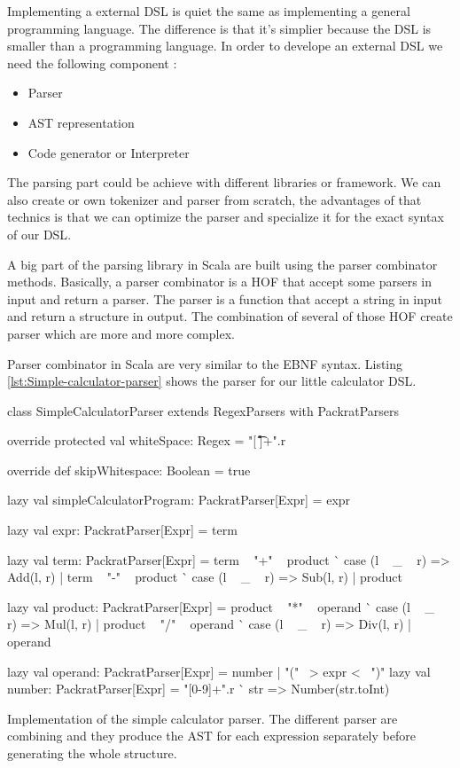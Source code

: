 Implementing a external \gls{DSL} is quiet the same as implementing a general
programming language. The difference is that it's simplier because the \gls{DSL}
is smaller than a programming language. In order to develope an external
\gls{DSL} we need the following component :

\begin{itemize}
\item Parser
\item \gls{AST} representation
\item Code generator or Interpreter
\end{itemize}


The parsing part could be achieve with different libraries or framework. We can
also create or own tokenizer and parser from scratch, the advantages of that
technics is that we can optimize the parser and specialize it for the exact
syntax of our \gls{DSL}.

A big part of the parsing library in Scala are built using the parser combinator
methods. Basically, a parser combinator is a \gls{HOF} that accept
some parsers in input and return a parser. The parser is a function that accept
a string in input and return a structure in output. The combination of several
of those \gls{HOF} create parser which are more and more complex.

Parser combinator in Scala are very similar to the \gls{EBNF} syntax. Listing
\ref{lst:Simple-calculator-parser} shows the parser for our little calculator
\gls{DSL}.

\begin{listing}[ht]
\centering
\begin{scalacode}
class SimpleCalculatorParser extends RegexParsers with PackratParsers {
  override protected val whiteSpace: Regex = "[ \t\r\f\n]+".r

  override def skipWhitespace: Boolean = true

  lazy val simpleCalculatorProgram: PackratParser[Expr] = expr

  lazy val expr: PackratParser[Expr] = term

  lazy val term: PackratParser[Expr] = {
    term ~ "+" ~ product ^^ { case (l ~ _ ~ r) => Add(l, r) } |
      term ~ "-" ~ product ^^ { case (l ~ _ ~ r) => Sub(l, r) } |
      product
  }

  lazy val product: PackratParser[Expr] = {
    product ~ "*" ~ operand ^^ { case (l ~ _ ~ r) => Mul(l, r) } |
      product ~ "/" ~ operand ^^ { case (l ~ _ ~ r) => Div(l, r) } |
      operand
  }

  lazy val operand: PackratParser[Expr] = number | "(" ~> expr <~ ")"
  lazy val number: PackratParser[Expr] = "[0-9]+".r ^^ { str => Number(str.toInt) }
}
\end{scalacode}
\caption[Implementation of the simple calculator parser]{Implementation of the
simple calculator parser. The different parser are combining and they produce
the \gls{AST} for each expression separately before generating the whole structure.}
\label{lst:Simple-calculator-parser}
\end{listing}

